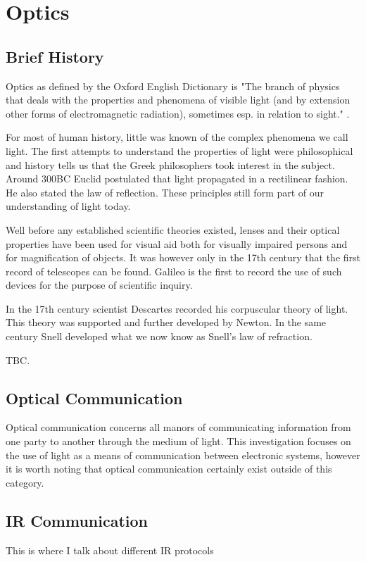 
\section{Optics}

\subsection{Brief History}
Optics as defined by the Oxford English Dictionary is "The branch of physics that deals with the properties and phenomena of visible light (and by extension other forms of electromagnetic radiation), sometimes esp. in relation to sight." \cite{oed}.

For most of human history, little was known of the complex phenomena we call light. The first attempts to understand the properties of light were philosophical and history tells us that the Greek philosophers took interest in the subject. Around 300BC Euclid postulated that light propagated in a rectilinear fashion. He also stated the law of reflection. These principles still form part of our understanding of light today. \cite{Vohnsen_2004}

Well before any established scientific theories existed, lenses and their optical properties have been used for visual aid both for visually impaired persons and for magnification of objects. It was however only in the 17th century that the first record of telescopes can be found. Galileo is the first to record the use of such devices for the purpose of scientific inquiry.

In the 17th century scientist Descartes recorded his corpuscular theory of light. This theory was supported and further developed by Newton. In the same century Snell developed what we now know as Snell's law of refraction.

TBC.

\subsection{Optical Communication}

Optical communication concerns all manors of communicating information from one party to another through the medium of light. This investigation focuses on the use of light as a means of communication between electronic systems, however it is worth noting that optical communication certainly exist outside of this category.


\subsection{IR Communication}
This is where I talk about different IR protocols

